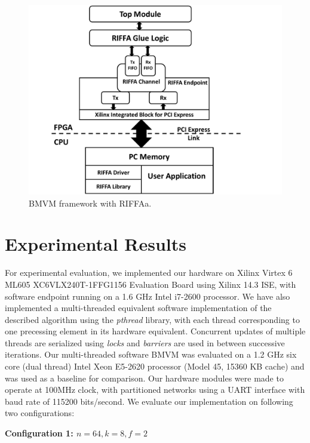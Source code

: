 \documentclass[conference, 9pt]{IEEEtran}
\begin{document}
\begin{figure}[t!]
\centering
\includegraphics[scale=0.34]{figs/riffa.pdf}
\caption{BMVM framework with RIFFAa.}
\label{fig:riffa}
\end{figure}

\section{Experimental Results}


For experimental evaluation, we implemented our hardware on Xilinx Virtex 6 ML605 XC6VLX240T-1FFG1156 Evaluation Board using Xilinx 14.3 ISE, with software endpoint running on a 1.6 GHz Intel i7-2600 processor. We have also implemented a multi-threaded equivalent software implementation of the described algorithm using the \emph{pthread} library, with each thread corresponding to one precessing element in its hardware equivalent. Concurrent updates of multiple threads are serialized using \emph{locks} and \emph{barriers} are used in between successive iterations. Our multi-threaded software BMVM was evaluated on a 1.2 GHz six core (dual thread) Intel Xeon E5-2620 processor (Model 45, 15360 KB cache) and was used as a baseline for comparison. Our hardware modules were made to operate at 100MHz clock, with partitioned networks using a UART interface with baud rate of 115200 bits/second. We evaluate our implementation on following two configurations:

\noindent \textbf{Configuration 1: $n = 64, k = 8, f = 2$}\\
\end{document}
